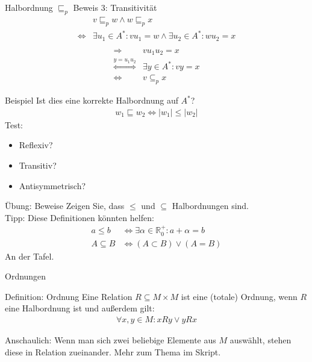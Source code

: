 \begin{frame}{Halbordnung $\sqsubseteq_p$ Beweis 3: Transitivität}
    \begin{align*}
        & v \sqsubseteq_p w \wedge w \sqsubseteq_p x\\
        \iff & \exists u_1 \in A^*:vu_1 = w \wedge \exists u_2 \in A^*: wu_2 = x\\
    \end{align*}
    \begin{align*}
        \Rightarrow & vu_1u_2 = x  \\
        \overset{y=u_1u_2}{\iff} & \exists y \in A^*: vy = x \\
        \iff & v \subseteq_p x
    \end{align*}
\end{frame}
\begin{frame}{Beispiel}
    Ist dies eine korrekte Halbordnung auf $A^*$?
    \begin{align*}
        w_1 \sqsubseteq w_2 \iff \left| w_1 \right| \leq \left| w_2 \right|
    \end{align*}
    \pause
    Test:
    \begin{itemize}
        \item Reflexiv? \visible<2->{Ja.}
        \item Transitiv? 
        \item Antisymmetrisch? 
    \end{itemize}
\end{frame}
\begin{frame}{Übung: Beweise}
    Zeigen Sie, dass $\leq$ und $\subseteq$ Halbordnungen sind.\\
    Tipp: Diese Definitionen könnten helfen:
    \begin{align*}
        a\leq b&\iff \exists \alpha \in \mathbb{R}_0^+ : a + \alpha = b\\
        A\subseteq B&\iff \left( A \subset B \right) \vee \left( A = B \right)
    \end{align*}
    An der Tafel.
\end{frame}
\begin{frame}{Ordnungen}
    \begin{block}{Definition: Ordnung}
        Eine Relation $R\subseteq M\times M$ ist eine (totale) Ordnung, wenn $R$ eine Halbordnung ist und außerdem gilt:
        \begin{align*}
            \forall x,y \in M: xRy \vee yRx
        \end{align*}
    \end{block}
    Anschaulich: Wenn man sich zwei beliebige Elemente aus $M$ auswählt, stehen diese in Relation zueinander.
    Mehr zum Thema im Skript.
\end{frame}
